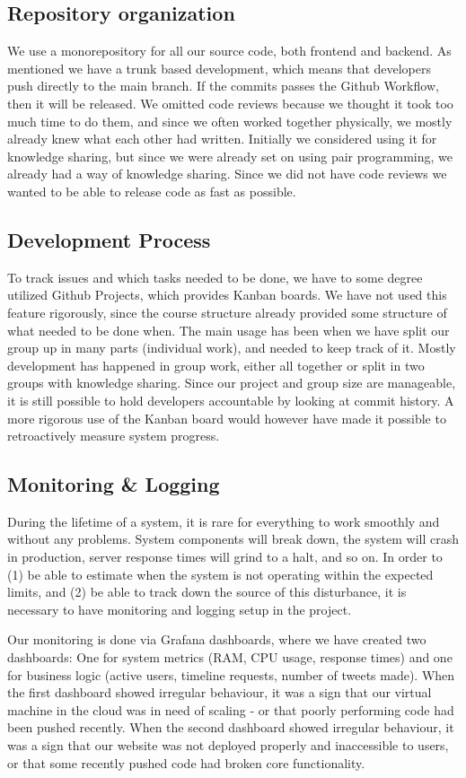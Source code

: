 \subsection{Repository organization}
We use a monorepository for all our source code, both frontend and backend. As mentioned we have a trunk based development, which means that developers push directly to the main branch. If the commits passes the Github Workflow, then it will be released. We omitted code reviews because we thought it took too much time to do them, and since we often worked together physically, we mostly already knew what each other had written. Initially we considered using it for knowledge sharing, but since we were already set on using pair programming, we already had a way of knowledge sharing. Since we did not have code reviews we wanted to be able to release code as fast as possible.

\subsection{Development Process}
To track issues and which tasks needed to be done, we have to some degree utilized Github Projects, which provides Kanban boards. We have not used this feature rigorously, since the course structure already provided some structure of what needed to be done when. The main usage has been when we have split our group up in many parts (individual work), and needed to keep track of it. Mostly development has happened in group work, either all together or split in two groups with knowledge sharing. Since our project and group size are manageable, it is still possible to hold developers accountable by looking at commit history. A more rigorous use of the Kanban board would however have made it possible to retroactively measure system progress. 

\subsection{Monitoring \& Logging}
During the lifetime of a system, it is rare for everything to work smoothly and without any problems. System components will break down, the system will crash in production, server response times will grind to a halt, and so on. In order to (1) be able to estimate when the system is not operating within the expected limits, and (2) be able to track down the source of this disturbance, it is necessary to have monitoring and logging setup in the project.

Our monitoring is done via Grafana dashboards, where we have created two dashboards: One for system metrics (RAM, CPU usage, response times) and one for business logic (active users, timeline requests, number of tweets made). When the first dashboard showed irregular behaviour, it was a sign that our virtual machine in the cloud was in need of scaling - or that poorly performing code had been pushed recently. When the second dashboard showed irregular behaviour, it was a sign that our website was not deployed properly and inaccessible to users, or that some recently pushed code had broken core functionality.

